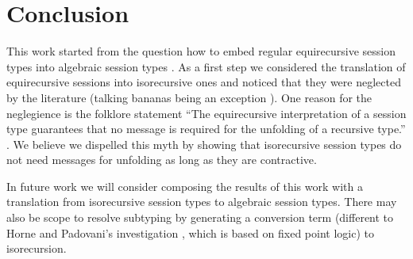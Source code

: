 
\section{Conclusion}
\label{sec:conclusion}

This work started from the question how to embed regular equirecursive
session types into algebraic session types
\cite{DBLP:journals/corr/abs-2304-03764}. As a first step we
considered the translation of equirecursive sessions into isorecursive
ones and noticed that they were neglected by the literature (talking
bananas being an exception \cite{DBLP:conf/icfp/LindleyM16}). One
reason for the neglegience is the folklore statement ``The
equirecursive interpretation of a session type guarantees that no 
message is required for the unfolding of a recursive type.''
\cite{DBLP:journals/pacmpl/BalzerP17}. We believe we dispelled this
myth by showing that isorecursive session types do not need messages
for unfolding as long as they are contractive.

In future work we will consider composing the results of this work
with a translation from isorecursive session types to algebraic
session types. There may also be scope to resolve subtyping by generating a conversion term
(different to Horne and Padovani's investigation
\cite{DBLP:journals/corr/abs-2304-06398}, which is based on fixed point logic) to isorecursion. 


